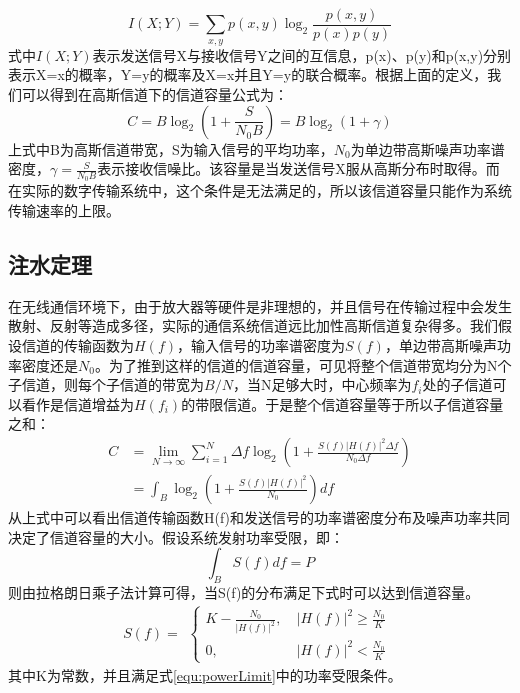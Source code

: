 \begin{equation}
I(X;Y)=\sum_{x,y}p(x,y)\log_2\frac{p(x,y)}{p(x)p(y)}
\end{equation}
式中$I(X;Y)$表示发送信号X与接收信号Y之间的互信息，p(x)、p(y)和p(x,y)分别表示X=x的概率，Y=y的概率及X=x并且Y=y的联合概率。根据上面的定义，我们可以得到在高斯信道下的信道容量公式为：
\begin{equation}
C = B\log_2\left(1+\frac{S}{N_0B}\right)=B\log_2(1+\gamma)
\end{equation}
上式中B为高斯信道带宽，S为输入信号的平均功率，$N_0$为单边带高斯噪声功率谱密度，$\gamma=\frac{S}{N_0B}$表示接收信噪比。该容量是当发送信号X服从高斯分布时取得。而在实际的数字传输系统中，这个条件是无法满足的，所以该信道容量只能作为系统传输速率的上限。
\subsection{注水定理}
在无线通信环境下，由于放大器等硬件是非理想的，并且信号在传输过程中会发生散射、反射等造成多径，实际的通信系统信道远比加性高斯信道复杂得多。我们假设信道的传输函数为$H(f)$，输入信号的功率谱密度为$S(f)$，单边带高斯噪声功率密度还是$N_0$。为了推到这样的信道的信道容量，可见将整个信道带宽均分为N个子信道，则每个子信道的带宽为$B/N$，当N足够大时，中心频率为$f_i$处的子信道可以看作是信道增益为$H(f_i)$的带限信道。于是整个信道容量等于所以子信道容量之和：
\begin{equation}
\begin{aligned}
C&=\lim_{N\rightarrow \infty}\sum_{i=1}^{N}\Delta f\log_2\left(1+\frac{S(f)|H(f)|^2\Delta f}{N_0 \Delta f}\right) \\
&=\int_B \log_2\left(1+\frac{S(f)|H(f)|^2}{N_0}\right)df
\end{aligned}
\end{equation}
从上式中可以看出信道传输函数H(f)和发送信号的功率谱密度分布及噪声功率共同决定了信道容量的大小。假设系统发射功率受限，即：
\begin{equation}
\label{equ:powerLimit}
\int_B S(f)df=P
\end{equation}
则由拉格朗日乘子法计算可得，当S(f)的分布满足下式时可以达到信道容量。
\begin{equation}
\label{equ:water_filling}
S(f)=
\begin{aligned}
\begin{cases}
K-\frac{N_0}{|H(f)|^2},&\ |H(f)|^2\geq\frac{N_0}{K} \\
0  ,&\ |H(f)|^2<\frac{N_0}{K}
\end{cases}
\end{aligned}
\end{equation}
其中K为常数，并且满足式\ref{equ:powerLimit}中的功率受限条件。

